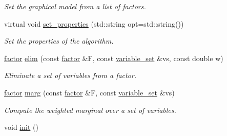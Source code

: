 \begin{DoxyCompactItemize}
\begin{DoxyCompactList}\small\item\em Set the graphical model from a list of factors. \end{DoxyCompactList}\item 
virtual void \hyperlink{classmerlin_1_1bte_a4575ce9a5103c26a43d9f6a2b0c1741a}{set\+\_\+properties} (std\+::string opt=std\+::string())
\begin{DoxyCompactList}\small\item\em Set the properties of the algorithm. \end{DoxyCompactList}\item 
\hyperlink{classmerlin_1_1factor}{factor} \hyperlink{classmerlin_1_1bte_a82c7024ba8f5a54a3c9fc21061fe41c8}{elim} (const \hyperlink{classmerlin_1_1factor}{factor} \&F, const \hyperlink{classmerlin_1_1variable__set}{variable\+\_\+set} \&vs, const double w)
\begin{DoxyCompactList}\small\item\em Eliminate a set of variables from a factor. \end{DoxyCompactList}\item 
\hyperlink{classmerlin_1_1factor}{factor} \hyperlink{classmerlin_1_1bte_a9df39d32d5f8665669436b408cc76787}{marg} (const \hyperlink{classmerlin_1_1factor}{factor} \&F, const \hyperlink{classmerlin_1_1variable__set}{variable\+\_\+set} \&vs)
\begin{DoxyCompactList}\small\item\em Compute the weighted marginal over a set of variables. \end{DoxyCompactList}\item 
void \hyperlink{classmerlin_1_1bte_aff473532708590dd696a6fd40d9d62e8}{init} ()\hypertarget{classmerlin_1_1bte_aff473532708590dd696a6fd40d9d62e8}{}\label{classmerlin_1_1bte_aff473532708590dd696a6fd40d9d62e8}


\end{DoxyCompactItemize}
